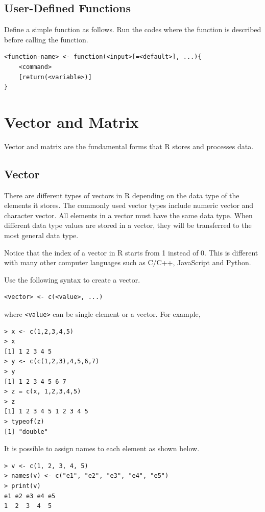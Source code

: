 \subsection{User-Defined Functions}

Define a simple function as follows. Run the codes where the function is described before calling the function.
\begin{lstlisting}
<function-name> <- function(<input>[=<default>], ...){
	<command>
	[return(<variable>)]
}
\end{lstlisting}

\section{Vector and Matrix}

Vector and matrix are the fundamental forms that R stores and processes data.

\subsection{Vector}

There are different types of vectors in R depending on the data type of the elements it stores. The commonly used vector types include numeric vector and character vector. All elements in a vector must have the same data type. When different data type values are stored in a vector, they will be transferred to the most general data type.

Notice that the index of a vector in R starts from 1 instead of 0. This is different with many other computer languages such as C/C++, JavaScript and Python.

Use the following syntax to create a vector.
\begin{lstlisting}
<vector> <- c(<value>, ...)
\end{lstlisting}
where \verb|<value>| can be single element or a vector. For example,
\begin{lstlisting}
> x <- c(1,2,3,4,5)
> x
[1] 1 2 3 4 5
> y <- c(c(1,2,3),4,5,6,7)
> y
[1] 1 2 3 4 5 6 7
> z = c(x, 1,2,3,4,5)
> z
[1] 1 2 3 4 5 1 2 3 4 5
> typeof(z)
[1] "double"
\end{lstlisting}
It is possible to assign names to each element as shown below.
\begin{lstlisting}
> v <- c(1, 2, 3, 4, 5)
> names(v) <- c("e1", "e2", "e3", "e4", "e5") 	
> print(v)
e1 e2 e3 e4 e5
1  2  3  4  5
\end{lstlisting}

